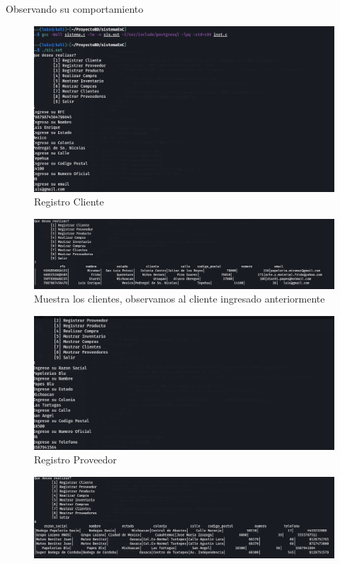 \documentclass[letter,12pt]{article}
\begin{document}
Observando su comportamiento
\begin{center}
\begin{figure}[H]
\includegraphics[scale=.44]{func1.png}
\caption{Registro Cliente}
\end{figure}
\begin{figure}[H]
\includegraphics[scale=.35]{func1-1.png}
\caption{Muestra los clientes, observamos al cliente ingresado anteriormente}
\end{figure}
\begin{figure}[H]
\includegraphics[scale=.45]{func2.png}
\caption{Registro Proveedor}
\end{figure}
\begin{figure}[H]
\includegraphics[scale=.40]{func2-1.png}

\end{figure}
\end{center}
\end{document}
